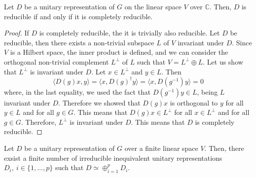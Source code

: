 \begin{theorem}[Weyl]
    Let $D$ be a unitary representation of $G$ on the linear space $V$ over $\mathbb{C}$. Then, $D$ is reducible if and only if it is completely reducible.
\end{theorem}
\begin{proof}
    If $D$ is completely reducible, the it is trivially also reducible.
    Let $D$ be reducible, then there exists a non-trivial subspace $L$ of $V$ invariant under $D$. Since $V$ is a Hilbert space, the inner product is defined, and we can consider the orthogonal non-trivial complement $L^{\bot}$ of $L$ such that $V = L^{\bot} \oplus L$.
    Let us show that $L^{\bot}$ is invariant under $D$. Let $x \in L^{\bot}$ and $y \in L$. Then
    \begin{equation*}
        \langle D(g)x, y \rangle = \langle x, D(g)^{\dagger} y \rangle = \langle x, D(g^{-1})y \rangle = 0
    \end{equation*}
    where, in the last equality, we used the fact that $D(g^{-1})y \in L$, being $L$ invariant under $D$. Therefore we showed that $D(g)x$ is orthogonal to $y$ for all $y \in L$ and for all $g \in G$. This means that $D(g)x \in L^{\bot}$ for all $x \in L^{\bot}$ and for all $g \in G$. Therefore, $L^{\bot}$ is invariant under $D$. This means that $D$ is completely reducible.
\end{proof}

\begin{proposition}
    Let $D$ be a unitary representation of $G$ over a finite linear space $V$. Then, there exsist a finite number of irreducible inequivalent unitary representations $D_i,\ i \in \{1, \ldots, p\}$ such that $D \simeq \oplus_{i=1}^p D_i$.
\end{proposition}

